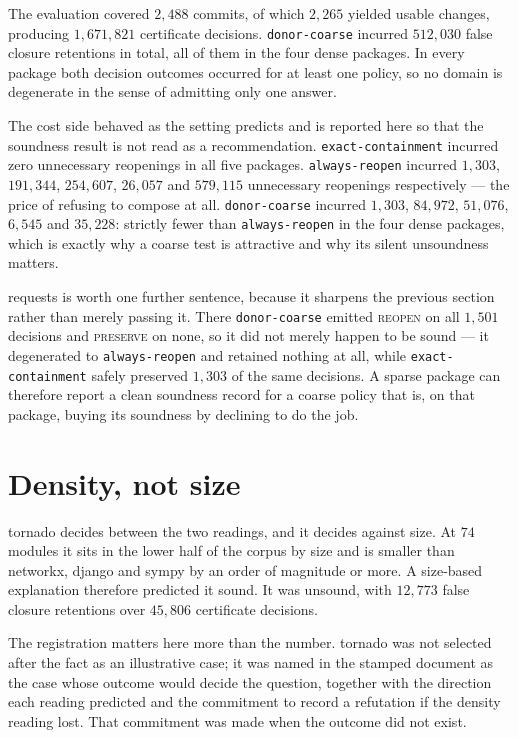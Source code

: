 \documentclass[11pt]{article}
\begin{document}
The evaluation covered $2{,}488$ commits, of which $2{,}265$ yielded usable changes, producing $1{,}671{,}821$ certificate decisions. \texttt{donor-coarse} incurred $512{,}030$ false closure retentions in total, all of them in the four dense packages. In every package both decision outcomes occurred for at least one policy, so no domain is degenerate in the sense of admitting only one answer.

The cost side behaved as the setting predicts and is reported here so that the soundness result is not read as a recommendation. \texttt{exact-containment} incurred zero unnecessary reopenings in all five packages. \texttt{always-reopen} incurred $1{,}303$, $191{,}344$, $254{,}607$, $26{,}057$ and $579{,}115$ unnecessary reopenings respectively --- the price of refusing to compose at all. \texttt{donor-coarse} incurred $1{,}303$, $84{,}972$, $51{,}076$, $6{,}545$ and $35{,}228$: strictly fewer than \texttt{always-reopen} in the four dense packages, which is exactly why a coarse test is attractive and why its silent unsoundness matters.

requests is worth one further sentence, because it sharpens the previous section rather than merely passing it. There \texttt{donor-coarse} emitted \textsc{reopen} on all $1{,}501$ decisions and \textsc{preserve} on none, so it did not merely happen to be sound --- it degenerated to \texttt{always-reopen} and retained nothing at all, while \texttt{exact-containment} safely preserved $1{,}303$ of the same decisions. A sparse package can therefore report a clean soundness record for a coarse policy that is, on that package, buying its soundness by declining to do the job.

\section{Density, not size}
tornado decides between the two readings, and it decides against size. At $74$ modules it sits in the lower half of the corpus by size and is smaller than networkx, django and sympy by an order of magnitude or more. A size-based explanation therefore predicted it sound. It was unsound, with $12{,}773$ false closure retentions over $45{,}806$ certificate decisions.

The registration matters here more than the number. tornado was not selected after the fact as an illustrative case; it was named in the stamped document as the case whose outcome would decide the question, together with the direction each reading predicted and the commitment to record a refutation if the density reading lost. That commitment was made when the outcome did not exist.
\end{document}
